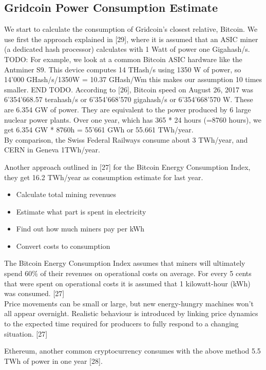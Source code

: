 \subsection{Gridcoin Power Consumption Estimate}

We start to calculate the consumption of Gridcoin's closest relative, Bitcoin. 
We use first the approach explained in [29], where it is assumed that an ASIC miner (a dedicated hash processor) calculates with 1 Watt of power one Gigahash/s. TODO: For example, we look at a common Bitcoin ASIC hardware like the Antminer S9. This device computes 14 THash/s using 1350 W of power, so 14'000 GHash/s/1350W = 10.37 GHash/Wm this makes our assumption 10 times smaller. END TODO. According to [26], Bitcoin speed on August 26, 2017 was 6'354'668.57 terahash/s or 6'354'668'570 gigahash/s or 6'354'668'570 W. These are 6.354 GW of power. They are equivalent to the power produced by 6 large nuclear power plants. Over one year, which has 365 * 24 hours (=8760 hours), we get 6.354 GW * 8760h = 55'661 GWh or 55.661 TWh/year.\\ 

By comparison, the Swiss Federal Railways consume about 3 TWh/year, and CERN in Geneva 1TWh/year.

Another approach outlined in [27] for the Bitcoin Energy Consumption Index, they get 16.2 TWh/year as consumption estimate for last year.

\begin{itemize}
	\item Calculate total mining revenues
	\item Estimate what part is spent in electricity
	\item Find out how much miners pay per kWh
	\item Convert costs to consumption
\end{itemize}

The Bitcoin Energy Consumption Index assumes that miners will ultimately spend 60\% of their revenues on operational costs on average. For every 5 cents that were spent on operational costs it is assumed that 1 kilowatt-hour (kWh) was consumed. [27]\\

Price movements can be small or large, but new energy-hungry machines won't all appear overnight. Realistic behaviour is introduced by linking price dynamics to the expected time required for producers to fully respond to a changing situation. [27]

Ethereum, another common cryptocurrency consumes with the above method 5.5 TWh of power in one year [28].\\


